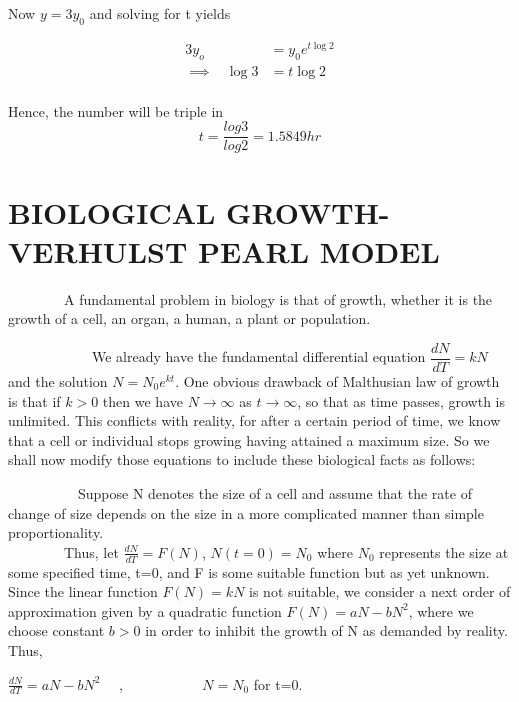 Now $y=3y_{0}$ and solving for t yields
\begin{center}
	\begin{eqnarray*}			
 				3y_{o}&=y_{0}e^{t\log2} \\
 				\implies ~~~~  \log3&=t\log2 \\
 	\end{eqnarray*}
\end{center}
               
		

 Hence, the number will be triple in 
$$t=\frac{log3}{log2}=1.5849 hr$$ 


 


\pagebreak

\section{BIOLOGICAL GROWTH-\\VERHULST PEARL MODEL}


\par ~~~~~~~~A fundamental problem in biology is that of growth, whether it is the growth of a cell, an organ, a human, a plant or population.

\par ~~~~~~~~~~~~We already have the fundamental differential equation $\dfrac{dN}{dT}=kN$ and the solution $N=N_{0}e^{kt}$. One obvious drawback of Malthusian law of growth is that if $k>0$ then we have $N\rightarrow \infty$ as $t\rightarrow \infty$, so that as time passes, growth is unlimited. This conflicts with reality, for after a certain period of time, we know that a cell or individual stops growing having attained a maximum size. So we shall now modify those equations to include these biological facts as follows:

\par ~~~~~~~~~~Suppose N denotes the size of a cell and assume that the rate of change of size depends on the size in a more complicated manner than simple proportionality.  \\
\linebreak
~~~~~~~~Thus, let $\frac{dN}{dT}=F(N)$, $N(t=0)=N_{0}$ where $N_{0}$ represents the size at some specified time, t=0, and F is some suitable function but as yet unknown. Since the linear function $F(N)=kN$ is not suitable, we consider a next order of approximation given by a quadratic function $F(N)=aN-bN^{2}$, where we choose constant $b>0$ in order to inhibit the growth of N as demanded by reality.
\\
Thus, \begin{center}
	$\frac{dN}{dT}=aN-bN^{2}$  ~~, 
	~~~~~~~~~~	$N=N_{0}$ for t=0.
\end{center}

